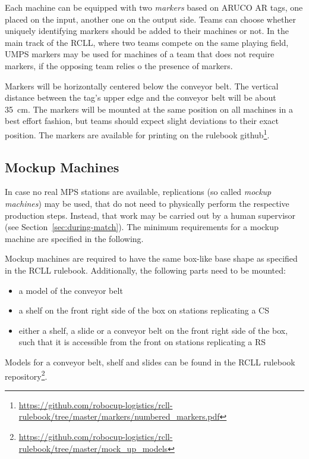 \documentclass[12pt,twoside]{article}
\newcommand{\refsec}[1]{Section~\ref{#1}}
\begin{document}
Each machine can be equipped with two \emph{markers} based on ARUCO AR tags,
one placed on the input, another one on the output side.
Teams can choose whether uniquely identifying markers should be added to their
machines or not.
In the main track of the \ac{RCLL}, where two teams compete on the same playing
field, \acl{UMPS} markers may be used for machines of a team that
does not require markers, if the opposing team relies o the presence of markers.

Markers will be
horizontally centered below the conveyor belt. The vertical distance
between the tag's upper edge and the conveyor belt will be about
\SI{35}{\centi\metre}. The markers will be mounted at the same
position on all machines in a best effort fashion, but teams should expect
slight deviations to their exact position.
The markers are available for printing on the rulebook github\footnote{
  \url{https://github.com/robocup-logistics/rcll-rulebook/tree/master/markers/numbered_markers.pdf} %
}.

\subsection{Mockup Machines}
\label{sec:mockup-machines}
In case no real \ac{MPS} stations are available, replications
(so called \emph{mockup machines}) may be used, that do not need to
physically perform the respective production steps. Instead, that work may
be carried out by a human supervisor (see \refsec{sec:during-match}).
The minimum requirements for a mockup machine are specified in the following.

Mockup machines are required to have the same box-like base shape as specified
in the \ac{RCLL} rulebook.
Additionally, the following parts need to be mounted:
\begin{itemize}
	\item a model of the conveyor belt
	\item a shelf on the front right side of the box on stations replicating a
		CS
	\item either a shelf, a slide or a conveyor belt on the front right side
of the box, such that it is accessible from the front on stations replicating a
		\ac{RS}
\end{itemize}
Models for a conveyor belt, shelf and slides can be found in the
\ac{RCLL} rulebook repository\footnote{\url{https://github.com/robocup-logistics/rcll-rulebook/tree/master/mock_up_models}}. %
\end{document}
